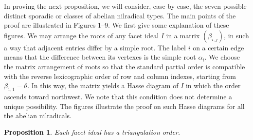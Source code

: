 \documentclass[10pt]{amsart}
\newtheorem{pro}[thm]{Proposition}
\theoremstyle{definition}
\theoremstyle{remark}
\newcommand\al{\alpha}
\newcommand\be{\beta}
\begin{document}
\par
In proving the next proposition, we will consider, case by case, the seven possible distinct sporadic or classes of abelian nilradical types.  
The main points of the proof are illustrated in Figures 1--9. 
We first give some explanation of these figures. 
We may arrange the roots of any facet ideal $I$ in a matrix $(\be_{i,j})$, in such a way that adjacent entries differ by a simple root. 
The label $i$ on a certain edge means that  the difference between its vertexes is the simple root $\al_i$. 
We choose the matrix arrangement of roots so that the standard partial order is compatible with the reverse lexicographic order of row and column indexes, starting from $\be_{1,1}=\theta$.
In this way, the matrix yields a Hasse diagram of $I$ in which  the order ascends toward northwest. 
We note that this condition does not determine a unique possibility. 
The figures illustrate  the proof on such Hasse diagrams for all the abelian nilradicals.

\begin{pro}\label{pro:tri-ord-existence}
Each facet ideal has a triangulation order.
\end{pro}
\end{document}

